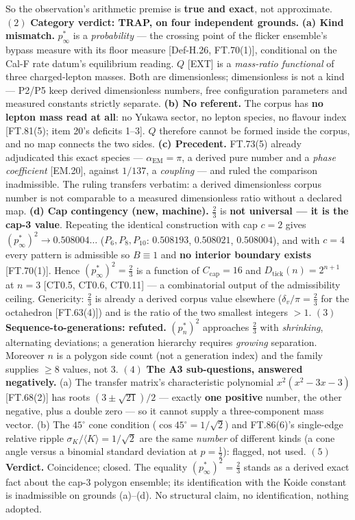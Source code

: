 \documentclass[11pt,openany]{report}
\theoremstyle{canonplain}
\theoremstyle{canondef}
\begin{document}
So the observation's arithmetic premise is \textbf{true and exact}, not approximate. $(2)$ \textbf{Category verdict: TRAP, on four independent grounds.} \textbf{(a) Kind mismatch.} $p^*_\infty$ is a \textit{probability} — the crossing point of the flicker ensemble's bypass measure with its floor measure [Def-H.26, FT.70(1)], conditional on the Cal-F rate datum's equilibrium reading. $Q$ [EXT] is a \textit{mass-ratio functional} of three charged-lepton masses. Both are dimensionless; dimensionless is not a kind — P2/P5 keep derived dimensionless numbers, free configuration parameters and measured constants strictly separate. \textbf{(b) No referent.} The corpus has \textbf{no lepton mass read at all}: no Yukawa sector, no lepton species, no flavour index [FT.81(5); item 20's deficits 1–3]. $Q$ therefore cannot be formed inside the corpus, and no map connects the two sides. \textbf{(c) Precedent.} FT.73(5) already adjudicated this exact species — $\alpha_{\mathrm{EM}}=\pi$, a derived pure number and a \textit{phase coefficient} [EM.20], against $1/137$, a \textit{coupling} — and ruled the comparison inadmissible. The ruling transfers verbatim: a derived dimensionless corpus number is not comparable to a measured dimensionless ratio without a declared map. \textbf{(d) Cap contingency (new, machine).} $\tfrac23$ is \textbf{not universal — it is the cap-3 value}. Repeating the identical construction with cap $c=2$ gives $(p^*_\infty)^2\to0.508004\ldots$ ($P_6,P_8,P_{10}$: $0.508193$, $0.508021$, $0.508004$), and with $c=4$ every pattern is admissible so $B\equiv1$ and \textbf{no interior boundary exists} [FT.70(1)]. Hence $(p^*_\infty)^2=\tfrac23$ is a function of $C_{\mathrm{cap}}=16$ and $D_{\mathrm{tick}}(n)=2^{n+1}$ at $n=3$ [CT0.5, CT0.6, CT0.11] — a combinatorial output of the admissibility ceiling. Genericity: $\tfrac23$ is already a derived corpus value elsewhere ($\delta_v/\pi=\tfrac23$ for the octahedron [FT.63(4)]) and is the ratio of the two smallest integers $>1$. $(3)$ \textbf{Sequence-to-generations: refuted.} $(p^*_n)^2$ approaches $\tfrac23$ with \textit{shrinking}, alternating deviations; a generation hierarchy requires \textit{growing} separation. Moreover $n$ is a polygon side count (not a generation index) and the family supplies $\ge8$ values, not $3$. $(4)$ \textbf{The A3 sub-questions, answered negatively.} (a) The transfer matrix's characteristic polynomial $x^2(x^2-3x-3)$ [FT.68(2)] has roots $(3\pm\sqrt{21})/2$ — exactly \textbf{one positive} number, the other negative, plus a double zero — so it cannot supply a three-component mass vector. (b) The $45^\circ$ cone condition ($\cos45^\circ=1/\sqrt2$) and FT.86(6)'s single-edge relative ripple $\sigma_K/\langle K\rangle=1/\sqrt2$ are the same \textit{number} of different kinds (a cone angle versus a binomial standard deviation at $p=\tfrac12$): flagged, not used. $(5)$ \textbf{Verdict.} Coincidence; closed. The equality $(p^*_\infty)^2=\tfrac23$ stands as a derived exact fact about the cap-3 polygon ensemble; its identification with the Koide constant is inadmissible on grounds (a)–(d). No structural claim, no identification, nothing adopted.
\end{document}

